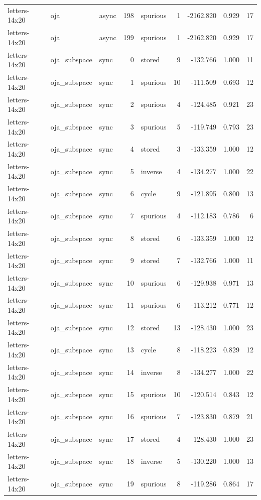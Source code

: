 \begin{tabular}{lllrlrrrr}
letters-14x20 & oja & async & 198 & spurious & 1 & -2162.820 & 0.929 & 17 \\
letters-14x20 & oja & async & 199 & spurious & 1 & -2162.820 & 0.929 & 17 \\
letters-14x20 & oja\_subspace & sync & 0 & stored & 9 & -132.766 & 1.000 & 11 \\
letters-14x20 & oja\_subspace & sync & 1 & spurious & 10 & -111.509 & 0.693 & 12 \\
letters-14x20 & oja\_subspace & sync & 2 & spurious & 4 & -124.485 & 0.921 & 23 \\
letters-14x20 & oja\_subspace & sync & 3 & spurious & 5 & -119.749 & 0.793 & 23 \\
letters-14x20 & oja\_subspace & sync & 4 & stored & 3 & -133.359 & 1.000 & 12 \\
letters-14x20 & oja\_subspace & sync & 5 & inverse & 4 & -134.277 & 1.000 & 22 \\
letters-14x20 & oja\_subspace & sync & 6 & cycle & 9 & -121.895 & 0.800 & 13 \\
letters-14x20 & oja\_subspace & sync & 7 & spurious & 4 & -112.183 & 0.786 & 6 \\
letters-14x20 & oja\_subspace & sync & 8 & stored & 6 & -133.359 & 1.000 & 12 \\
letters-14x20 & oja\_subspace & sync & 9 & stored & 7 & -132.766 & 1.000 & 11 \\
letters-14x20 & oja\_subspace & sync & 10 & spurious & 6 & -129.938 & 0.971 & 13 \\
letters-14x20 & oja\_subspace & sync & 11 & spurious & 6 & -113.212 & 0.771 & 12 \\
letters-14x20 & oja\_subspace & sync & 12 & stored & 13 & -128.430 & 1.000 & 23 \\
letters-14x20 & oja\_subspace & sync & 13 & cycle & 8 & -118.223 & 0.829 & 12 \\
letters-14x20 & oja\_subspace & sync & 14 & inverse & 8 & -134.277 & 1.000 & 22 \\
letters-14x20 & oja\_subspace & sync & 15 & spurious & 10 & -120.514 & 0.843 & 12 \\
letters-14x20 & oja\_subspace & sync & 16 & spurious & 7 & -123.830 & 0.879 & 21 \\
letters-14x20 & oja\_subspace & sync & 17 & stored & 4 & -128.430 & 1.000 & 23 \\
letters-14x20 & oja\_subspace & sync & 18 & inverse & 5 & -130.220 & 1.000 & 13 \\
letters-14x20 & oja\_subspace & sync & 19 & spurious & 8 & -119.286 & 0.864 & 17 \\

\end{tabular}
